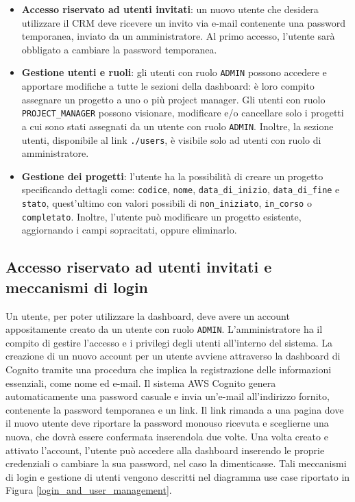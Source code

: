 \documentclass[target=bach,aauheader=,style=]{thud}
\begin{document}
\begin{itemize}
    \item \textbf{Accesso riservato ad utenti invitati}: un nuovo utente che desidera utilizzare il CRM deve ricevere un invito via e-mail contenente una password temporanea, inviato da un amministratore. Al primo accesso, l'utente sarà obbligato a cambiare la password temporanea.
    \item \textbf{Gestione utenti e ruoli}: gli utenti con ruolo \texttt{ADMIN} possono accedere e apportare modifiche a tutte le sezioni della dashboard: è loro compito assegnare un progetto a uno o più project manager. Gli utenti con ruolo \texttt{PROJECT\_MANAGER} possono visionare, modificare e/o cancellare solo i progetti a cui sono stati assegnati da un utente con ruolo \texttt{ADMIN}. Inoltre, la sezione utenti, disponibile al link \texttt{./users}, è visibile solo ad utenti con ruolo di amministratore.
    \item \textbf{Gestione dei progetti}: l'utente ha la possibilità di creare un progetto specificando dettagli come: \texttt{codice}, \texttt{nome}, \texttt{data\_di\_inizio}, \texttt{data\_di\_fine} e \texttt{stato}, quest'ultimo con valori possibili di \texttt{non\_iniziato}, \texttt{in\_corso} o \texttt{completato}. Inoltre, l'utente può modificare un progetto esistente, aggiornando i campi sopracitati, oppure eliminarlo.
\end{itemize}

\subsection{Accesso riservato ad utenti invitati e meccanismi di login}
Un utente, per poter utilizzare la dashboard, deve avere un account appositamente creato da un utente con ruolo \texttt{ADMIN}. L'amministratore ha il compito di gestire l'accesso e i privilegi degli utenti all'interno del sistema. La creazione di un nuovo account per un utente avviene attraverso la dashboard di Cognito tramite una procedura che implica la registrazione delle informazioni essenziali, come nome ed e-mail. Il sistema AWS Cognito genera automaticamente una password casuale e invia un'e-mail all'indirizzo fornito, contenente la password temporanea e un link. Il link rimanda a una pagina dove il nuovo utente deve riportare la password monouso ricevuta e sceglierne una nuova, che dovrà essere confermata inserendola due volte. Una volta creato e attivato l'account, l'utente può accedere alla dashboard inserendo le proprie credenziali o cambiare la sua password, nel caso la dimenticasse. Tali meccanismi di login e gestione di utenti vengono descritti nel diagramma use case riportato in Figura \ref{login_and_user_management}.
\end{document}
